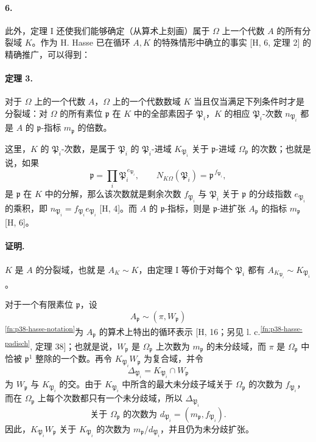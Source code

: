 \documentclass[11pt]{article}
\begin{document}
\paragraph{6.}
此外，定理 I 还使我们能够确定（从算术上刻画）属于 \(\Omega\) 上一个代数 \(A\) 的所有分裂域 \(K\)。作为 H. Hasse 已在循环 \(A,K\) 的特殊情形中确立的事实 [H, 6, 定理 2] 的精确推广，可以得到：

\paragraph{定理 3.}
对于 \(\Omega\) 上的一个代数 \(A\)，\(\Omega\) 上的一个代数数域 \(K\) 当且仅当满足下列条件时才是分裂域：对 \(\Omega\) 的所有素位 \(\mathfrak p\) 在 \(K\) 中的全部素因子 \(\mathfrak P_i\)，\(K\) 的相应 \(\mathfrak P_i\)-次数 \(n_{\mathfrak P_i}\) 都是 \(A\) 的 \(\mathfrak p\)-指标 \(m_{\mathfrak p}\) 的倍数。

这里，\(K\) 的 \(\mathfrak P_i\)-次数，是属于 \(\mathfrak P_i\) 的 \(\mathfrak P_i\)-进域 \(K_{\mathfrak P_i}\) 关于 \(\mathfrak p\)-进域 \(\Omega_{\mathfrak p}\) 的次数；也就是说，如果
\[
\mathfrak p=\prod_i \mathfrak P_i^{\,e_{\mathfrak P_i}},
        \qquad N_{K\Omega}(\mathfrak P_i)=\mathfrak p^{\,f_{\mathfrak P_i}},
\]
是 \(\mathfrak p\) 在 \(K\) 中的分解，那么该次数就是剩余次数 \(f_{\mathfrak P_i}\) 与 \(\mathfrak P_i\) 关于 \(\mathfrak p\) 的分歧指数 \(e_{\mathfrak P_i}\) 的乘积，即 \(n_{\mathfrak P_i}=f_{\mathfrak P_i}e_{\mathfrak P_i}\) [H, 4]。而 \(A\) 的 \(\mathfrak p\)-指标，则是 \(\mathfrak p\)-进扩张 \(A_{\mathfrak p}\) 的指标 \(m_{\mathfrak p}\) [H, 6]。

\paragraph{证明.}
\(K\) 是 \(A\) 的分裂域，也就\,是 \(A_K\sim K\)，由定理 I 等价于对每个 \(\mathfrak P_i\) 都有 \(A_{K_{\mathfrak P_i}}\sim K_{\mathfrak P_i}\)。

对于一个有限素位 \(\mathfrak p\)，设
\[
        A_{\mathfrak p}\sim(\pi,W_{\mathfrak p})
\]
\textsuperscript{\ref{fn:p38-hasse-notation}}为 \(A_{\mathfrak p}\) 的算术上特出的循环表示 [H, 16；另见 l. c.\textsuperscript{\ref{fn:p38-hasse-padisch}}, 定理 38]；也就是说，\(W_{\mathfrak p}\) 是 \(\Omega_{\mathfrak p}\) 上次数为 \(m_{\mathfrak p}\) 的未分歧域，而 \(\pi\) 是 \(\Omega_{\mathfrak p}\) 中恰被 \(\mathfrak p^1\) 整除的一个数。再令 \(K_{\mathfrak P_i}W_{\mathfrak p}\) 为复合域，并令
\[
        \Delta_{\mathfrak P_i}=K_{\mathfrak P_i}\cap W_{\mathfrak p}
\]
为 \(W_{\mathfrak p}\) 与 \(K_{\mathfrak P_i}\) 的交。由于 \(K_{\mathfrak P_i}\) 中所含的最大未分歧子域关于 \(\Omega_{\mathfrak p}\) 的次数为 \(f_{\mathfrak P_i}\)，而在 \(\Omega_{\mathfrak p}\) 上每个次数都只有一个未分歧域，所以 \(\Delta_{\mathfrak P_i}\)
\[
        \text{关于 }\Omega_{\mathfrak p}\text{ 的次数为 }d_{\mathfrak P_i}=(m_{\mathfrak p},f_{\mathfrak P_i}).
\]
因此，\(K_{\mathfrak P_i}W_{\mathfrak p}\) 关于 \(K_{\mathfrak P_i}\) 的次数为 \(m_{\mathfrak p}/d_{\mathfrak P_i}\)，并且仍为未分歧扩张。
\end{document}
